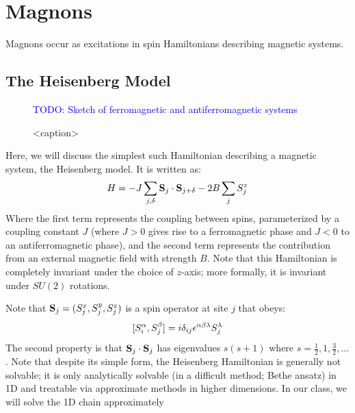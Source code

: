 \section{Magnons}

Magnons occur as excitations in spin Hamiltonians describing magnetic systems.

\subsection{The Heisenberg Model}

\begin{figure}[htbp]
    \centering
    \textcolor{blue}{TODO: Sketch of ferromagnetic and antiferromagnetic systems}
    \caption{<caption>}
    \label{<label>}
\end{figure}

Here, we will discuss the simplest such Hamiltonian describing a magnetic system, the Heisenberg model. It is written as:
\begin{equation}
    H = -J\sum_{j, \delta}\mathbf{S}_j \cdot \mathbf{S}_{j+\delta} - 2B\sum_j S_j^z
\end{equation}
Where the first term represents the coupling between spins, parameterized by a coupling constant $J$ (where $J > 0$ gives rise to a ferromagnetic phase and $J < 0$ to an antiferromagnetic phase), and the second term represents the contribution from an external magnetic field with strength $B$. Note that this Hamiltonian is completely invariant under the choice of $z$-axis; more formally, it is invariant under $SU(2)$ rotations.

Note that $\mathbf{S}_j = (S_j^x, S_j^y, S_j^z)$ is a spin operator at site $j$ that obeys:
\begin{equation}\label{eq-spinalgebra}
    [S^\alpha_i, S^\beta_j] = i\delta_{ij}\epsilon^{\alpha\beta\lambda}S^\lambda_j
\end{equation}
The second property is that $\mathbf{S}_j \cdot \mathbf{S}_j$ has eigenvalues $s(s+1)$ where $s = \frac{1}{2},1,\frac{3}{2},\ldots$. Note that despite its simple form, the Heisenberg Hamiltonian is generally not solvable; it is only analytically solvable (in a difficult method; Bethe ansatz) in 1D and treatable via approximate methods in higher dimensions. In our class, we will solve the 1D chain approximately

